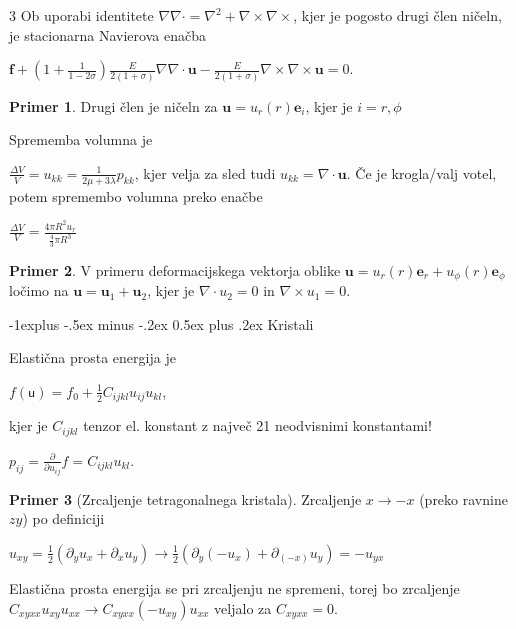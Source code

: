 \documentclass[10pt,landscape]{article}
\makeatletter
\renewcommand{\subsection}{\@startsection{subsection}{2}{0mm}%
	{-1explus -.5ex minus -.2ex}%
	{0.5ex plus .2ex}%
	{\normalfont\normalsize\bfseries}}
\theoremstyle{definition}
\newtheorem*{primer}{Primer}
\makeatother
\begin{document}
\begin{multicols}{3}
  Ob uporabi identitete \( \nabla \nabla \cdot = \nabla ^2 + \nabla \times \nabla \times \), kjer je pogosto drugi člen ničeln, je stacionarna Navierova enačba 

  \( \mathbf{f} + \left( 1 + \frac{1}{1 - 2 \sigma} \right) \frac{E}{2 (1 + \sigma)} \nabla \nabla \cdot \mathbf{u} - \frac{E}{2(1 + \sigma)} \nabla \times \nabla \times \mathbf{u} = 0  \).

  \begin{primer}
    Drugi člen je ničeln za \( \mathbf{u} = u_r (r) \mathbf{e}_i \), kjer je \( i = r, \phi \)
  \end{primer}
  
  Sprememba volumna je

  \( \frac{\Delta V}{V} = u_{kk} = \frac{1}{2 \mu + 3 \lambda} p_{kk} \), kjer velja za sled tudi \( u_{kk} = \nabla \cdot \mathbf{u} \). Če je krogla/valj votel, potem spremembo volumna preko enačbe

  \( \frac{\Delta V}{V} = \frac{4 \pi R ^2 u_r}{\frac{4}{3} \pi R ^3} \)

  \begin{primer}
    V primeru deformacijskega vektorja oblike \( \mathbf{u} = u_r (r) \mathbf{e}_r + u_{\phi} (r) \mathbf{e}_{\phi} \) ločimo na \( \mathbf{u} = \mathbf{u}_1 + \mathbf{u}_2\), kjer je \( \nabla \cdot u_2 = 0 \) in \( \nabla \times u_1 = 0 \).
  \end{primer}

  \subsection{Kristali}

  Elastična prosta energija je

  \( f(\mathsf{u}) = f_0 + \frac{1}{2} C_{ijkl} u_{ij} u_{kl} \),

  kjer je \( C_{ijkl} \) tenzor el. konstant z največ 21 neodvisnimi konstantami!

  \( p_{ij} = \frac{\partial }{\partial u_{ij}} f = C_{ijkl} u_{kl} \).
  
  \begin{primer}[Zrcaljenje tetragonalnega kristala]
    Zrcaljenje \( x \to -x \) (preko ravnine \( zy \)) po definiciji

    \( u_{xy} = \frac{1}{2} \left( \partial_y u_x + \partial_x u_y \right) \to \frac{1}{2} \left( \partial_y (- u_x ) + \partial_{(-x)} u_y \right) = - u_{yx} \)

    Elastična prosta energija se pri zrcaljenju ne spremeni, torej bo zrcaljenje \( C_{xyxx} u_{xy} u_{xx} \to C_{xyxx} (-u_{xy}) u_{xx} \) veljalo za \( C_{xyxx} = 0 \).
  \end{primer}
  

\end{multicols}
\end{document}
